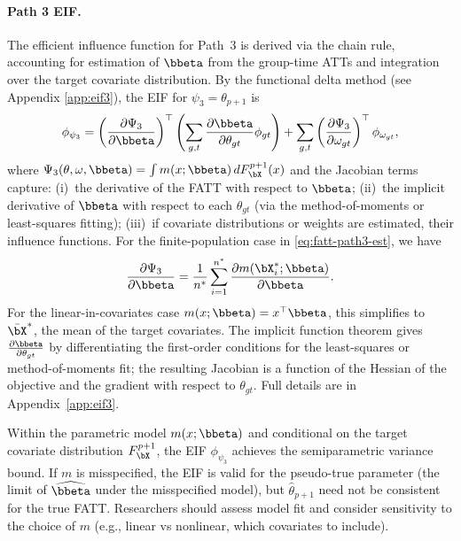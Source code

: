 \documentclass{article}
\begin{document}
\paragraph{Path 3 EIF.} The efficient influence function for Path~3 is derived via the chain rule, accounting for estimation of $\bbeta$ from the group-time ATTs and integration over the target covariate distribution. By the functional delta method (see Appendix \ref{app:eif3}), the EIF for $\psi_3 = \theta_{p+1}$ is
\begin{align*}
    \phi_{\psi_3} = \left(\frac{\partial \Psi_3}{\partial \bbeta}\right)^\top \left( \sum_{g,t} \frac{\partial \bbeta}{\partial \theta_{gt}} \phi_{gt} \right) + \sum_{g,t} \left(\frac{\partial \Psi_3}{\partial \omega_{gt}}\right)^\top \phi_{\omega_{gt}},
\end{align*}
where $\Psi_3(\theta, \omega, \bbeta) = \int m(x;\bbeta) \, dF_{\bX}^{p+1}(x)$ and the Jacobian terms capture: (i)~the derivative of the FATT with respect to $\bbeta$; (ii)~the implicit derivative of $\bbeta$ with respect to each $\theta_{gt}$ (via the method-of-moments or least-squares fitting); (iii)~if covariate distributions or weights are estimated, their influence functions. For the finite-population case in \eqref{eq:fatt-path3-est}, we have
\begin{align*}
    \frac{\partial \Psi_3}{\partial \bbeta} = \frac{1}{n^*} \sum_{i=1}^{n^*} \frac{\partial m(\bX_i^*; \bbeta)}{\partial \bbeta}.
\end{align*}
For the linear-in-covariates case $m(x;\bbeta) = x^\top \bbeta$, this simplifies to $\bar{\bX}^*$, the mean of the target covariates. The implicit function theorem gives $\frac{\partial \bbeta}{\partial \theta_{gt}}$ by differentiating the first-order conditions for the least-squares or method-of-moments fit; the resulting Jacobian is a function of the Hessian of the objective and the gradient with respect to $\theta_{gt}$. Full details are in Appendix~\ref{app:eif3}.

Within the parametric model $m(x;\bbeta)$ and conditional on the target covariate distribution $F_{\bX}^{p+1}$, the EIF $\phi_{\psi_3}$ achieves the semiparametric variance bound. If $m$ is misspecified, the EIF is valid for the pseudo-true parameter (the limit of $\widehat{\bbeta}$ under the misspecified model), but $\widehat{\theta}_{p+1}$ need not be consistent for the true FATT. Researchers should assess model fit and consider sensitivity to the choice of $m$ (e.g., linear vs nonlinear, which covariates to include).
\end{document}
